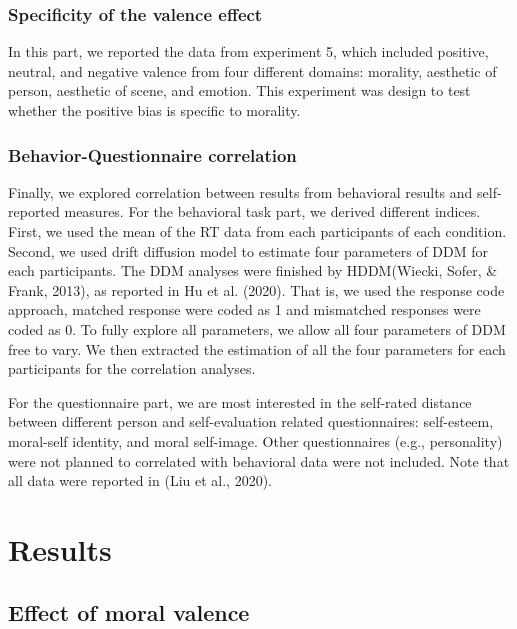 \documentclass[
  english,
  man]{apa6}
\begin{document}
\hypertarget{specificity-of-the-valence-effect}{%
\subsubsection{Specificity of the valence effect}\label{specificity-of-the-valence-effect}}

In this part, we reported the data from experiment 5, which included positive, neutral, and negative valence from four different domains: morality, aesthetic of person, aesthetic of scene, and emotion. This experiment was design to test whether the positive bias is specific to morality.

\hypertarget{behavior-questionnaire-correlation}{%
\subsubsection{Behavior-Questionnaire correlation}\label{behavior-questionnaire-correlation}}

Finally, we explored correlation between results from behavioral results and self-reported measures.
For the behavioral task part, we derived different indices. First, we used the mean of the RT data from each participants of each condition. Second, we used drift diffusion model to estimate four parameters of DDM for each participants.
The DDM analyses were finished by HDDM(Wiecki, Sofer, \& Frank, 2013), as reported in Hu et al. (2020). That is, we used the response code approach, matched response were coded as 1 and mismatched responses were coded as 0. To fully explore all parameters, we allow all four parameters of DDM free to vary. We then extracted the estimation of all the four parameters for each participants for the correlation analyses.

For the questionnaire part, we are most interested in the self-rated distance between different person and self-evaluation related questionnaires: self-esteem, moral-self identity, and moral self-image. Other questionnaires (e.g., personality) were not planned to correlated with behavioral data were not included. Note that all data were reported in (Liu et al., 2020).

\hypertarget{results}{%
\section{Results}\label{results}}

\hypertarget{effect-of-moral-valence}{%
\subsection{Effect of moral valence}\label{effect-of-moral-valence}}
\end{document}
